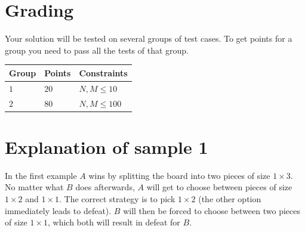 \section*{Grading}
Your solution will be tested on several groups of test cases. To get points for a group you need to pass all the tests of that group.

\noindent
\begin{tabular}{| l | l | l |}
	\hline
	Group & Points & Constraints\\ \hline
 $1$    & $20$        & $N, M \le 10$ \\ \hline
 $2$    & $80$        & $N, M \le 100$ \\ \hline
\end{tabular}

\section*{Explanation of sample 1}
In the first example $A$ wins by splitting the board into two pieces of size $1 \times 3$.
No matter what $B$ does afterwards, $A$ will get to choose between pieces of size $1 \times 2$
and $1 \times 1$. The correct strategy is to pick $1 \times 2$ (the other option immediately leads
to defeat). $B$ will then be forced to choose between two pieces of size $1 \times 1$, which both
will result in defeat for $B$.
